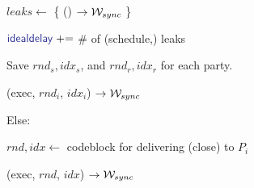 \begin{bbox}[title={Algorithm $\msf{SimPartyOut}(m, P_i')$}]
\begin{renumerate}
\begin{renumerate}
\begin{renumerate}
						\quad $leaks \leftarrow$ \{ \Send () $\rightarrow \mathcal{W}_{sync}$ \}

						\quad $\idealdelay \pluseq$ \# of (schedule,) leaks

						\quad Save $rnd_s,idx_s$, and $rnd_r,idx_r$ for each party.

						\quad \Send (exec, $rnd_i$, $idx_i$) $\rightarrow \mathcal{W}_{sync}$
						
				\end{renumerate}
			\item Else:

				\quad $rnd,idx \leftarrow$ codeblock for delivering (close) to $P_i$

				\quad \Send (exec, $rnd$, $idx$) $\rightarrow \mathcal{W}_{sync}$

			\end{renumerate}
	\end{renumerate}

\end{bbox}
